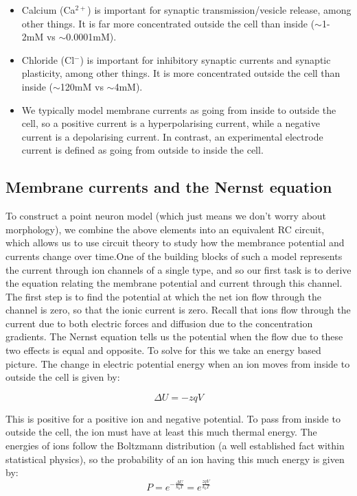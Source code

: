 \documentclass{article}
\begin{document}
\begin{itemize}
    \item Calcium (Ca$^{2+}$) is important for synaptic transmission/vesicle release, among other things. It is far more concentrated outside the cell than inside ($\sim$1-2mM vs $\sim$0.0001mM).
    \item Chloride (Cl$^-$) is important for inhibitory synaptic currents and synaptic plasticity, among other things. It is more concentrated outside the cell than inside ($\sim$120mM vs $\sim$4mM).
    \item We typically model membrane currents as going from inside to outside the cell, so a positive current is a hyperpolarising current, while a negative current is a depolarising current. In contrast, an experimental electrode current is defined as going from outside to inside the cell.
\end{itemize}

\subsection{Membrane currents and the Nernst equation}

To construct a point neuron model (which just means we don't worry about morphology), we combine the above elements into an equivalent RC circuit, which allows us to use circuit theory to study how the membrance potential and currents change over time.One of the building blocks of such a model represents the current through ion channels of a single type, and so our first task is to derive the equation relating the membrane potential and current through this channel.\\

The first step is to find the potential at which the net ion flow through the channel is zero, so that the ionic current is zero. Recall that ions flow through the current due to both electric forces and diffusion due to the concentration gradients. The Nernst equation tells us the potential when the flow due to these two effects is equal and opposite. To solve for this we take an energy based picture. The change in electric potential energy when an ion moves from inside to outside the cell is given by:

\begin{equation*}
    \Delta U = -zqV
\end{equation*}

This is positive for a positive ion and negative potential. To pass from inside to outside the cell, the ion must have at least this much thermal energy. The energies of ions follow the Boltzmann distribution (a well established fact within statistical physics), so the probability of an ion having this much energy is given by:
\begin{equation*}
    P = e^{-\frac{\Delta U}{k_bT}} = e^{\frac{zqV}{k_bT}}
\end{equation*}
\end{document}
